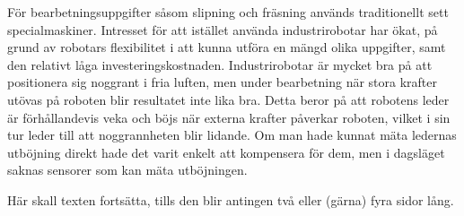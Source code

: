 \documentclass[svenska]{style/LTHthesis}
\begin{document}
För bearbetningsuppgifter såsom slipning och fräsning används traditionellt sett specialmaskiner. Intresset för att istället använda industrirobotar har ökat, på grund av robotars flexibilitet i att kunna utföra en mängd olika uppgifter, samt den relativt låga investeringskostnaden. Industrirobotar är mycket bra på att positionera sig noggrant i fria luften, men under bearbetning när stora krafter utövas på roboten blir resultatet inte lika bra. Detta beror på att robotens leder är förhållandevis veka och böjs när externa krafter påverkar roboten, vilket i sin tur leder till att noggrannheten blir lidande. Om man hade kunnat mäta ledernas utböjning direkt hade det varit enkelt att kompensera för dem, men i dagsläget saknas sensorer som kan mäta utböjningen.

Här skall texten fortsätta, tills den blir antingen två eller (gärna) fyra 
sidor lång.
\end{document}
